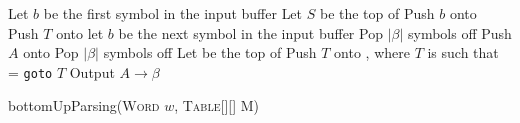 \documentclass{standalone}
\begin{document}
    \begin{algorithm}[H]
        \label{alg:btmup-parsing}
        \DontPrintSemicolon


        
        Let \(b\) be the first symbol in the input buffer \;
        \While{\t} {
            Let \(S\) be the top of \St \;
             {
                Push \(b\) onto \Symb \;
                Push \(T\) onto \St \;
                let \(b\) be the next symbol in the input buffer \;
            }
             {
                Pop \(|\beta|\) symbols off \Symb \;
                Push \(A\) onto \Symb \;
                Pop \(|\beta|\) symbols off \St \;
                Let \Tmp be the top of \St \;
                Push \(T\) onto \St, where \(T\) is such that  = \texttt{goto} \(T\) \;
                Output \(A \to \beta\) \;
            }
             {
                \Return{} \;
            }
            \Else{
                \ferr{}
            }
        }


        \caption{bottomUpParsing(\textsc{Word} \(w\), \textsc{Table}[][] M)}
    \end{algorithm}
\end{document}
